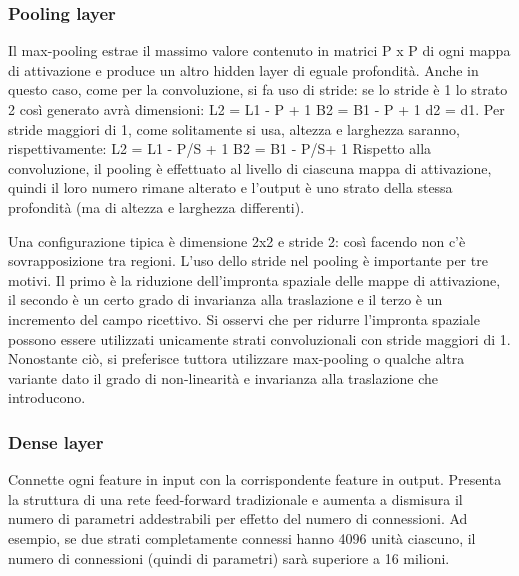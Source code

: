 \documentclass[14pt]{extarticle}
\begin{document}
\subsubsection{Pooling layer}
Il max-pooling estrae il massimo valore contenuto in matrici P x P di ogni mappa di
attivazione e produce un altro hidden layer di eguale profondità. Anche in questo caso,
come per la convoluzione, si fa uso di stride: se lo stride è 1 lo strato 2 così generato
avrà dimensioni:
L2 = L1 - P + 1
B2 = B1 - P + 1
d2 = d1.
Per stride maggiori di 1, come solitamente si usa, altezza e larghezza saranno, rispettivamente:
L2 = L1 - P/S + 1
B2 = B1 - P/S+ 1
Rispetto alla convoluzione, il pooling è effettuato al livello di ciascuna mappa di attivazione, quindi il loro numero rimane alterato e l’output è uno strato della stessa profondità (ma di altezza e larghezza differenti).

 Una configurazione tipica è dimensione
2x2 e stride 2: così facendo non c’è sovrapposizione tra regioni.
L’uso dello stride nel pooling è importante per tre motivi. Il primo è la riduzione
dell’impronta spaziale delle mappe di attivazione, il secondo è un certo grado di invarianza alla traslazione e il terzo è un incremento del campo ricettivo. Si osservi che per
ridurre l’impronta spaziale possono essere utilizzati unicamente strati convoluzionali
con stride maggiori di 1. Nonostante ciò, si preferisce tuttora utilizzare max-pooling o
qualche altra variante dato il grado di non-linearità e invarianza alla traslazione che
introducono.\cite{aggarwal2018neural}
\subsubsection{Dense layer}
Connette ogni feature in input con la corrispondente feature in output. Presenta la struttura di una rete feed-forward tradizionale e aumenta a dismisura il numero di parametri
addestrabili per effetto del numero di connessioni. Ad esempio, se due strati completamente connessi hanno 4096 unità ciascuno, il numero di connessioni (quindi di
parametri) sarà superiore a 16 milioni. \cite{aggarwal2018neural}
\end{document}
